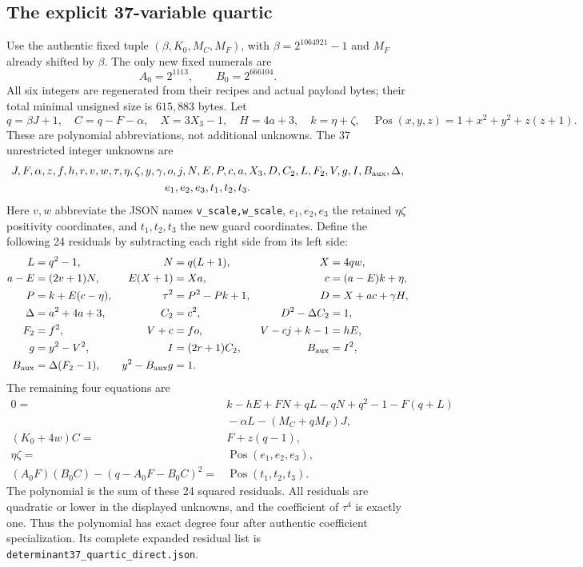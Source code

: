\subsection{The explicit 37-variable quartic}
Use the authentic fixed tuple $(\beta,K_0,M_C,M_F)$, with
$\beta=2^{1064921}-1$ and $M_F$ already shifted by $\beta$.
The only new fixed numerals are
\[
 A_0=2^{1113},\qquad B_0=2^{666104}.
\]
All six integers are regenerated from their recipes and actual payload bytes;
their total minimal unsigned size is $615{,}883$ bytes.
Let
\[
 q=\beta J+1,\quad C=q-F-\alpha,\quad X=3X_3-1,\quad
 H=4a+3,\quad k=\eta+\zeta,
 \quad \operatorname{Pos}(x,y,z)=1+x^2+y^2+z(z+1).
\]
These are polynomial abbreviations, not additional unknowns.
The 37 unrestricted integer unknowns are
\[
\begin{gathered}
 J,F,\alpha,z,f,h,r,v,w,\tau,\eta,\zeta,y,\gamma,o,j,
 N,E,P,c,a,X_3,D,C_2,L,F_2,V,g,I,B_{\rm aux},\Delta,\\
 e_1,e_2,e_3,t_1,t_2,t_3.
\end{gathered}
\]
Here $v,w$ abbreviate the JSON names \texttt{v\_scale,w\_scale},
$e_1,e_2,e_3$ the retained $\eta\zeta$ positivity coordinates,
and $t_1,t_2,t_3$ the new guard coordinates.
Define the following 24 residuals by subtracting each right side from its
left side:
\begin{align*}
 L&=q^2-1,&N&=q(L+1),&X&=4qw,\\
 a-E&=(2v+1)N,&E(X+1)&=Xa,&c&=(a-E)k+\eta,\\
 P&=k+E(c-\eta),&\tau^2&=P^2-Pk+1,&D&=X+ac+\gamma H,\\
 \Delta&=a^2+4a+3,&C_2&=c^2,&D^2-\Delta C_2&=1,\\
 F_2&=f^2,&V+c&=fo,&V-cj+k-1&=hE,\\
 g&=y^2-V^2,&I&=(2r+1)C_2,&B_{\rm aux}&=I^2,\\
 B_{\rm aux}&=\Delta(F_2-1),&y^2-B_{\rm aux}g&=1.
\end{align*}
The remaining four equations are
\begin{align*}
 0={}&k-hE+FN+qL-qN+q^2-1-F(q+L)\\
 &{}-\alpha L-(M_C+qM_F)J,\\
 (K_0+4w)C={}&F+z(q-1),\\
 \eta\zeta={}&\operatorname{Pos}(e_1,e_2,e_3),\\
 (A_0F)(B_0C)-(q-A_0F-B_0C)^2={}&\operatorname{Pos}(t_1,t_2,t_3).
\end{align*}
The polynomial is the sum of these 24 squared residuals. All residuals are
quadratic or lower in the displayed unknowns, and the coefficient of
$\tau^4$ is exactly one. Thus the polynomial has exact degree four after
authentic coefficient specialization. Its complete expanded residual list is
\texttt{determinant37\_quartic\_direct.json}.

